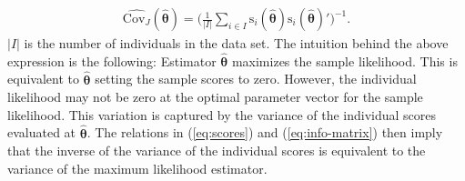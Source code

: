 \begin{align} \label{eq:est-cov}
\hat{\text{Cov}_J}(\pmb{\hat{\theta}}) = \bigg( \frac{1}{|I|} \sum_{i \in I} \text{s}_i(\pmb{\hat{\theta}})\text{s}_i(\pmb{\hat{\theta}})' \bigg)^{-1}.
\end{align}
$|I|$ is the number of individuals in the data set.
The intuition behind the above expression is the following: Estimator $\pmb{\hat{\theta}}$ maximizes the sample likelihood. This is equivalent to $\pmb{\hat{\theta}}$ setting the sample scores to zero. However, the individual likelihood may not be zero at the optimal parameter vector for the sample likelihood. This variation is captured by the variance of the individual scores evaluated at $\pmb{\hat{\theta}}$. The relations in (\ref{eq:scores}) and (\ref{eq:info-matrix}) then imply that the inverse of the variance of the individual scores is equivalent to the variance of the maximum likelihood estimator.